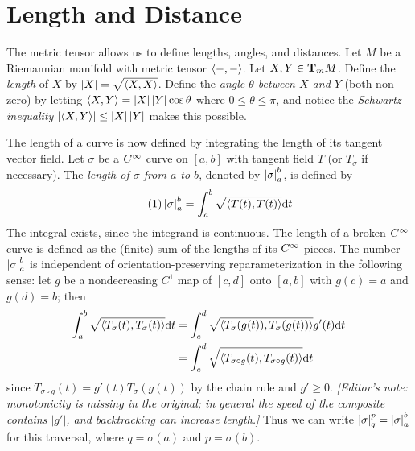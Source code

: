 \documentclass[../main]{subfiles}
\begin{document}
\section{Length and Distance}\label{ch06:s1}

The metric tensor allows us to define lengths, angles, and distances. Let $M$ be a Riemannian manifold with metric tensor $\ip{-}{-}$. Let $X,Y\in\tangentspace{M}{m}$. Define the \emph{length} of $X$ by $\norm{X} = \sqrt{\ip{X}{X}}$. Define the \emph{angle $\theta$ between $X$ and $Y$} (both non-zero) by letting $\ip{X}{Y} = \norm{X}\norm{Y}\cos\theta$
where $0 \le \theta \le \pi$, and notice the \emph{Schwartz inequality} $\norm{\ip{X}{Y}} \le \norm{X}\norm{Y}$
makes this possible.

The length of a curve is now defined by integrating the length of its tangent vector field. Let $\sigma$ be a $\CInfty$ curve on $[a,b]$ with tangent field $T$ (or $T_\sigma$ if necessary). The \emph{length of $\sigma$ from $a$ to $b$}, denoted by $\norm{\sigma}_a^b$, is defined by
\begin{equation}\tag{1}\label{eqn:ch6.1.1}
    \norm{\sigma}_a^b = \int_a^b \sqrt{\ip{T(t)}{T(t)}}\dd t
\end{equation}
The integral exists, since the integrand is continuous. The length of a broken $\CInfty$ curve is defined as the (finite) sum of the lengths of its $\CInfty$ pieces. The number $\norm\sigma_a^b$ is independent of orientation-preserving reparameterization in the following sense: let $g$ be a nondecreasing $C^1$ map of $[c,d]$ onto $[a,b]$ with $g(c)=a$ and $g(d)=b$; then
\begin{align*}
    \int_a^b\sqrt{\ip{T_\sigma(t)}{T_\sigma(t)}}\dd t
    &= \int_c^d\sqrt{\ip{T_\sigma(g(t))}{T_\sigma(g(t))}}g'(t)\dd t \\
    &= \int_c^d\sqrt{\ip{T_{\sigma\circ g}(t)}{T_{\sigma\circ g}(t)}}\dd t
\end{align*}
since $T_{\sigma\circ g}(t)=g'(t)T_\sigma(g(t))$ by the chain rule and $g'\ge0$. \emph{[Editor's note: monotonicity is missing in the original; in general the speed of the composite contains $|g'|$, and backtracking can increase length.]} Thus we can write $\norm\sigma_q^p=\norm\sigma_a^b$ for this traversal, where $q=\sigma(a)$ and $p=\sigma(b)$.
\end{document}
